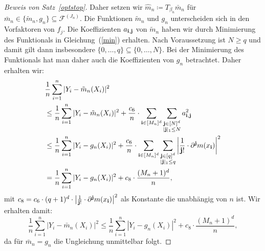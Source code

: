 \begin{proof}[Beweis von Satz~\ref{optstop}]
Daher setzen wir $\hat{m}_n \coloneqq T_{\beta_n}\bar{m}_n$ für $\bar{m}_n \in \{\tilde{m}_n, g_n\} \subseteq \mathcal{F}^{(J_n)}$.
Die Funktionen $\tilde{m}_n$ und $g_n$ unterscheiden sich in den Vorfaktoren von $f_j$. Die Koeffizienten $a_{\mathbf{i},\mathbf{j}}$ von $\tilde{m}_n$ haben wir durch Minimierung des Funktionals in Gleichung~(\ref{min}) erhalten. Nach Voraussetzung ist $N \geq q$ und damit gilt dann insbesondere $\{0,\dots,q\} \subseteq \{0,\dots,N\}$. Bei der Minimierung des Funktionals hat man daher auch die Koeffizienten von $g_n$ betrachtet. Daher erhalten wir:
\begin{equation}
\begin{split}
\label{tilde}
& \frac{1}{n} \sum_{i = 1}^n|Y_i - \tilde{m}_n(X_i)|^2 \\
& \leq \frac{1}{n} \sum_{i = 1}^n|Y_i - \tilde{m}_n(X_i)|^2 + \frac{c_6}{n} \cdot \sum_{\mathbf{i} \in [M_n]^d} \sum_{\substack{ \mathbf{j} \in [N]^d \\ |\mathbf{j}|_1 \leq N}} a_{\mathbf{i},\mathbf{j}}^2 \\
& \leq \frac{1}{n} \sum_{i = 1}^n|Y_i - g_n(X_i)|^2 + \frac{c_6}{n} \cdot \sum_{\mathbf{i} \in [M_n]^d} \sum_{\substack{ \mathbf{j} \in [q]^d \\ |\mathbf{j}|_1 \leq q}} \bigg|\frac{1}{\mathbf{j}!} \cdot \partial^{\mathbf{j}}m(x_{\mathbf{i}})\bigg|^2 \\
& = \frac{1}{n} \sum_{i = 1}^n|Y_i - g_n(X_i)|^2 + c_{8} \cdot \frac{(M_n + 1)^d}{n},
\end{split}
\end{equation}
mit $c_{8} = c_6 \cdot (q + 1)^d \cdot \big|\frac{1}{\mathbf{j}!} \cdot \partial^{\mathbf{j}}m(x_{\mathbf{i}})\big|^2$ als Konstante die unabhängig von $n$ ist.
Wir erhalten damit:
\begin{equation}
\label{bed}
\frac{1}{n} \sum_{i = 1}^n|Y_i - \bar{m}_n(X_i)|^2 \leq \frac{1}{n} \sum_{i = 1}^n|Y_i - g_n(X_i)|^2 + c_8 \cdot \frac{(M_n + 1)^d}{n},
\end{equation}
da für $\bar{m}_n = g_n$ die Ungleichung unmittelbar folgt.


\end{proof}
